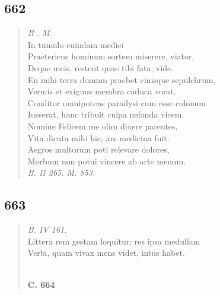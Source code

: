 \documentclass[11pt, a4paper]{report}
\begin{document}
            \subsection*{662}
      \begin{verse}
      \textit{B . M.} \\ In tumulo cuiudam medici \\ Praeteriens hominum sortem miserere, viator, \\ Deque meis, restent quae tibi fata, vide. \\ En mihi terra domnm praebet cinisque sepulchrum, \\ Vermis et exiguus membra caduca vorat. \\ Conditor omnipotens paradysi cum esse colonum \\ Iusserat, hanc tribuit culpa nefanda vicem. \\ Nomine Felicem me olim dixere parentes, \\ Vita dicata mihi hic, ars medicina fuit. \\ Aegros multorum poti relevare dolores, \\ Morbum non potui vincere ab arte menum. \\ \textit{B. II 265. M. 853.} \\ 
      \end{verse}
  
            \subsection*{663}
      \begin{verse}
      \textit{B. IV 161.} \\ Littera rem gestam loquitur; res ipsa medullam \\ Verbi, quam vivax mens videt, intus habet. \\ 
        ﻿\pagebreak 
    \begin{center} \textbf{C. 664} \end{center} \marginpar{[134]} 
      \end{verse}
  
\end{document}
